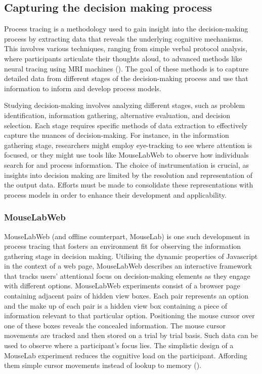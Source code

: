 \documentclass[man, floatsintext]{apa7}
\begin{document}
\subsection{Capturing the decision making process }

Process tracing is a methodology used to gain insight into the decision-making process by extracting data that reveals the underlying cognitive mechanisms. This involves various techniques, ranging from simple verbal protocol analysis, where participants articulate their thoughts aloud, to advanced methods like neural tracing using MRI machines (\cite{fordProcessTracingMethods1989}). The goal of these methods is to capture detailed data from different stages of the decision-making process and use that information to inform and develop process models.

Studying decision-making involves analyzing different stages, such as problem identification, information gathering, alternative evaluation, and decision selection. Each stage requires specific methods of data extraction to effectively capture the nuances of decision-making. For instance, in the information gathering stage, researchers might employ eye-tracking to see where attention is focused, or they might use tools like MouseLabWeb to observe how individuals search for and process information. The choice of instrumentation is crucial, as insights into decision making are limited by the resolution and representation of the output data. Efforts must be made to consolidate these representations with process models in order to enhance their development and applicability.

\subsubsection{MouseLabWeb}

MouseLabWeb (and offline counterpart, MouseLab) is one such development in process tracing that fosters an environment fit for observing the information gathering stage in decision making. Utilising the dynamic properties of Javascript in the context of a web page, MouseLabWeb describes an interactive framework that tracks users' attentional focus on decision-making elements as they engage with different options. MouseLabWeb experiments consist of a browser page containing adjacent pairs of hidden view boxes. Each pair represents an option and the make up of each pair is a hidden view box containing a piece of information relevant to that particular option. Positioning the mouse cursor over one of these boxes reveals the concealed information. The mouse cursor movements are tracked and then stored on a trial by trial basis. Such data can be used to observe where a participant's focus lies. The simplistic design of a MouseLab experiment reduces the cognitive load on the participant. Affording them simple cursor movements instead of lookup to memory (\cite{MouselabWEBa}). 
\end{document}
